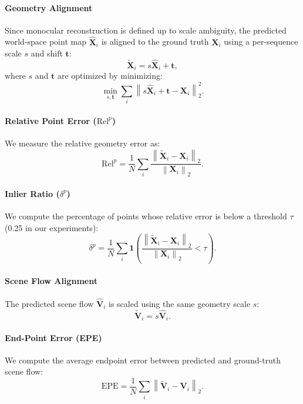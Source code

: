 \paragraph{Geometry Alignment}
Since monocular reconstruction is defined up to scale ambiguity, 
the predicted world-space point map $\hat{\mathbf{X}}_i$ is aligned to the ground truth $\mathbf{X}_i$ 
using a per-sequence scale $s$ and shift $\mathbf{t}$:
% 
\begin{equation}
\tilde{\mathbf{X}}_i = s \hat{\mathbf{X}}_i + \mathbf{t},
\end{equation}
% 
where $s$ and $\mathbf{t}$ are optimized by minimizing:
% 
\begin{equation}
\min_{s,\mathbf{t}} \sum_i 
\left\| s\hat{\mathbf{X}}_i + \mathbf{t} - \mathbf{X}_i \right\|_2^2.
\end{equation}

\paragraph{Relative Point Error ($\mathrm{Rel}^p$)}
We measure the relative geometry error as:
% 
\begin{equation}
\mathrm{Rel}^p =
\frac{1}{N}
\sum_i
\frac{
\left\|\tilde{\mathbf{X}}_i - \mathbf{X}_i\right\|_2
}{
\left\|\mathbf{X}_i\right\|_2
}.
\end{equation}

\paragraph{Inlier Ratio ($\delta^p$)}
We compute the percentage of points whose relative error is below a threshold $\tau$ (0.25 in our experiments):
% 
\begin{equation}
\delta^p =
\frac{1}{N}
\sum_i
\mathbf{1}
\left(
\frac{
\left\|\tilde{\mathbf{X}}_i - \mathbf{X}_i\right\|_2
}{
\left\|\mathbf{X}_i\right\|_2
}
< \tau
\right).
\end{equation}

\paragraph{Scene Flow Alignment}
The predicted scene flow $\hat{\mathbf{V}}_i$ is scaled using the same geometry scale $s$:
% 
\begin{equation}
\tilde{\mathbf{V}}_i = s \hat{\mathbf{V}}_i.
\end{equation}

\paragraph{End-Point Error (EPE)}
We compute the average endpoint error between predicted and ground-truth scene flow:
% 
\begin{equation}
\mathrm{EPE} =
\frac{1}{N}
\sum_i
\left\|
\tilde{\mathbf{V}}_i - \mathbf{V}_i
\right\|_2.
\end{equation}

